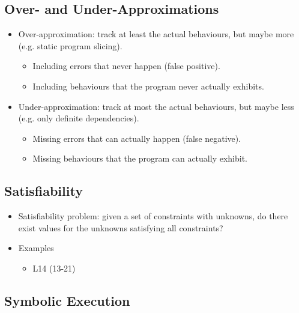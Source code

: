 \documentclass{article}
\begin{document}
\subsection{Over- and Under-Approximations}

\begin{itemize}
    \item Over-approximation: track at least the actual behaviours, but maybe more (e.g. static program slicing).
    \begin{itemize}
        \item Including errors that never happen (false positive).
        \item Including behaviours that the program never actually exhibits.
    \end{itemize}
    \item Under-approximation: track at most the actual behaviours, but maybe less (e.g. only definite dependencies).
    \begin{itemize}
        \item Missing errors that can actually happen (false negative).
        \item Missing behaviours that the program can actually exhibit.
    \end{itemize}
\end{itemize}

\subsection{Satisfiability}

\begin{itemize}
    \item Satisfiability problem: given a set of constraints with unknowns, do there exist values for the unknowns satisfying all constraints?
    \item Examples
    \begin{itemize}
        \item L14 (13-21)
    \end{itemize}
\end{itemize}

\subsection{Symbolic Execution}
\end{document}
